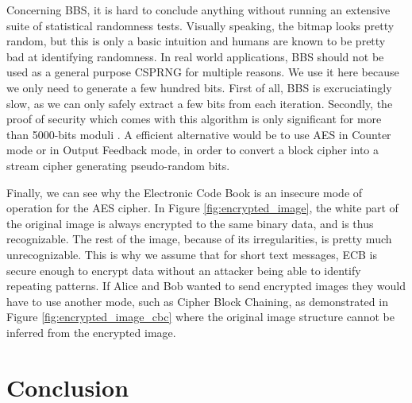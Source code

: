 \documentclass{article}
\begin{document}
\bigskip

Concerning BBS, it is hard to conclude anything without running an extensive suite of statistical randomness tests. Visually speaking, the bitmap looks pretty random, but this is only a basic intuition and humans are known to be pretty bad at identifying randomness\cite{Warren2018}.
In real world applications, BBS should not be used as a general purpose CSPRNG for multiple reasons. We use it here because we only need to generate a few hundred bits. First of all, BBS is excruciatingly slow, as we can only safely extract a few bits from each iteration. Secondly, the proof of security which comes with this algorithm is only significant for more than 5000-bits moduli \cite{blum:tightness} \cite{BlumBlum65:online}. A efficient alternative would be to use AES in Counter mode or in Output Feedback mode, in order to convert a block cipher into a stream cipher generating pseudo-random bits.

\bigskip

Finally, we can see why the Electronic Code Book is an insecure mode of operation for the AES cipher. In Figure \ref{fig:encrypted_image}, the white part of the original image is always encrypted to the same binary data, and is thus recognizable. The rest of the image, because of its irregularities, is pretty much unrecognizable. This is why we assume that for short text messages, ECB is secure enough to encrypt data without an attacker being able to identify repeating patterns. If Alice and Bob wanted to send encrypted images they would have to use another mode, such as Cipher Block Chaining, as demonstrated in Figure \ref{fig:encrypted_image_cbc} where the original image structure cannot be inferred from the encrypted image.

\section{Conclusion}



\bigskip




\end{document}
